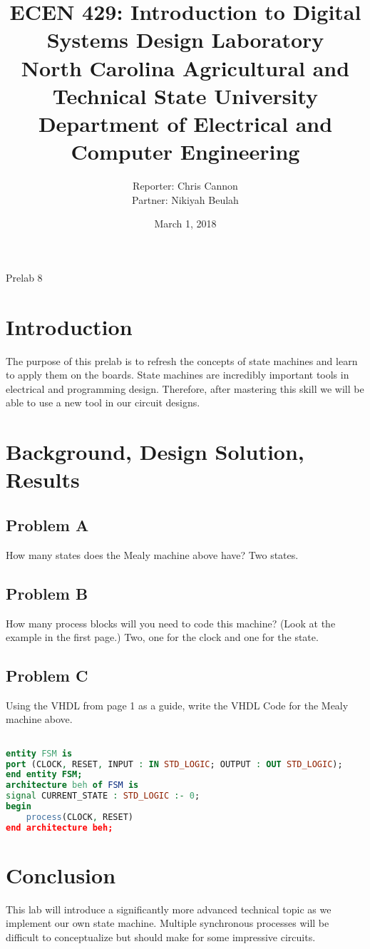 \documentclass[11pt]{article}
\title {{\titleFont ECEN 429: Introduction to Digital Systems Design Laboratory \\ North Carolina Agricultural and Technical State University \\ Department of Electrical and Computer Engineering}} %
\author{\titleFont Reporter: Chris Cannon \\ \titleFont Partner: Nikiyah Beulah} %
\date{\titleFont March 1, 2018}
\begin{document}
\begin{titlingpage}
\maketitle
\begin{center}
	Prelab 8
\end{center}
\end{titlingpage}

\section{Introduction}
The purpose of this prelab is to refresh the concepts of state machines and learn to apply them on the boards. State machines are incredibly important tools in electrical and programming design. Therefore, after mastering this skill we will be able to use a new tool in our circuit designs.

\section{Background, Design Solution, Results}
\subsection{Problem A}
How many states does the Mealy machine above have?
Two states.

\subsection{Problem B}
How many process blocks will you need to code this machine? (Look at the example in the first page.)
Two, one for the clock and one for the state.

\subsection{Problem C}
Using the VHDL from page 1 as a guide, write the VHDL Code for the Mealy machine above.

\begin{lstlisting}[language=VHDL]

entity FSM is 
port (CLOCK, RESET, INPUT : IN STD_LOGIC; OUTPUT : OUT STD_LOGIC); 
end entity FSM; 
architecture beh of FSM is 
signal CURRENT_STATE : STD_LOGIC :- 0;
begin 
	process(CLOCK, RESET)
end architecture beh;	

\end{lstlisting}

\section{Conclusion}
This lab will introduce a significantly more advanced technical topic as we implement our own state machine. Multiple synchronous processes will be difficult to conceptualize but should make for some impressive circuits.
\end{document}
